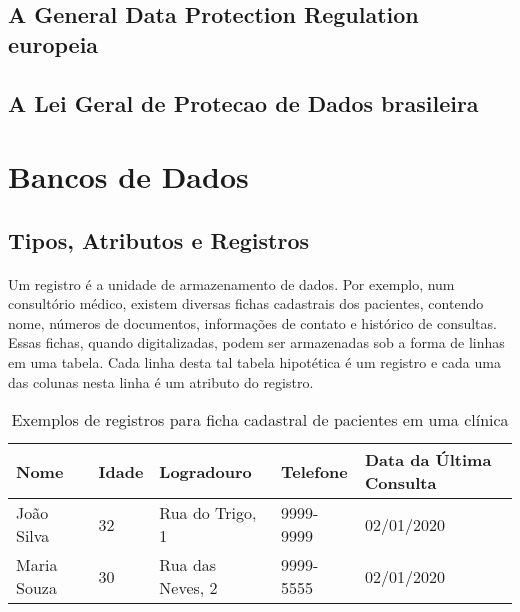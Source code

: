 \paragraph{}

\subsection{A General Data Protection Regulation europeia}

\paragraph{}

\subsection{A Lei Geral de Protecao de Dados brasileira}

\paragraph{}

\section{Bancos de Dados}

\subsection{Tipos, Atributos e Registros}

\paragraph{} Um registro é a unidade de armazenamento de dados. Por exemplo, num consultório médico, existem
diversas fichas cadastrais dos pacientes, contendo nome, números de documentos, informações de contato 
e histórico de consultas. Essas fichas, quando digitalizadas, podem ser armazenadas sob a forma de 
linhas em uma tabela. Cada linha desta tal tabela hipotética é um registro e cada uma das colunas 
nesta linha é um atributo do registro.

\begin{table}[ht]
    \caption{Exemplos de registros para ficha cadastral de pacientes em uma clínica}
    \label{table:registros}
    \begin{center}
        \begin{tabular}{| l | l | l | l | l |}
        \hline
        Nome & Idade & Logradouro & Telefone & Data da Última Consulta \\ \hline
        João Silva & 32 & Rua do Trigo, 1 & 9999-9999 & 02/01/2020 \\ \hline
        Maria Souza & 30 & Rua das Neves, 2 & 9999-5555 & 02/01/2020 \\ \hline
        \hline
        \end{tabular}
    \end{center}
\end{table}

